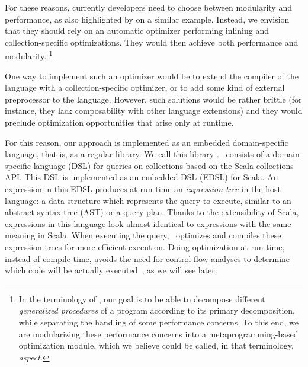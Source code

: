 
For these reasons, currently developers need to choose between modularity and
performance, as also highlighted by
\citet{AOP} on a similar example.
Instead, we envision that they should rely on an automatic optimizer performing inlining
and collection-specific optimizations. They would then achieve both performance and modularity.%
\footnote{In the terminology of \citet{AOP}, our goal is to be able to decompose
different \emph{generalized procedures} of a program according to its primary
decomposition, while separating the handling of some performance concerns. To
this end, we are modularizing these performance concerns into a
metaprogramming-based optimization module, which we believe
could be called, in that terminology, \emph{aspect}.}

One way to implement such an optimizer would be to extend the compiler of the language with a collection-specific optimizer, or 
to add some kind of external preprocessor to the language. However, such solutions would be rather brittle (for instance, they lack
composability with other language extensions) and they would preclude optimization opportunities that arise only at runtime.

For this reason, our approach is implemented as an embedded domain-specific language, that is, as a regular library.
We call this library \LoSDef. \LoS\ consists of a domain-specific language (DSL) for queries on collections based on the Scala collections API\@. 
This DSL is implemented as an embedded DSL (EDSL) for Scala. An expression in this EDSL produces at run time an \emph{expression tree} in the host language: a data structure which represents the query to execute, similar to an abstract syntax tree (AST) or a query plan. Thanks to the extensibility of Scala, expressions in this language look almost identical to expressions with the same meaning in Scala.
When executing the query, \LoS\ optimizes and compiles these expression trees for more efficient execution. Doing optimization at run time, instead of compile-time, avoids the need for control-flow analyses to determine which code will be actually executed~\citep{Chambers10}, as we will see later.

